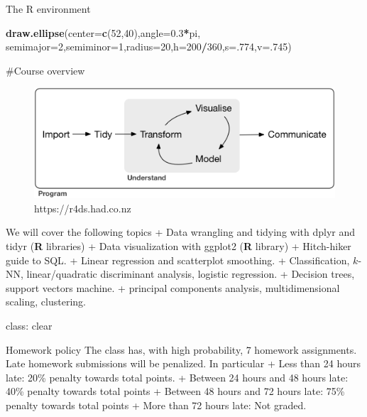 \documentclass[
  ignorenonframetext,
]{beamer}
\newenvironment{Shaded}{\begin{snugshade}}{\end{snugshade}}
\newcommand{\DataTypeTok}[1]{\textcolor[rgb]{0.13,0.29,0.53}{#1}}
\newcommand{\DecValTok}[1]{\textcolor[rgb]{0.00,0.00,0.81}{#1}}
\newcommand{\FloatTok}[1]{\textcolor[rgb]{0.00,0.00,0.81}{#1}}
\newcommand{\KeywordTok}[1]{\textcolor[rgb]{0.13,0.29,0.53}{\textbf{#1}}}
\newcommand{\NormalTok}[1]{#1}
\newcommand{\OperatorTok}[1]{\textcolor[rgb]{0.81,0.36,0.00}{\textbf{#1}}}
\begin{document}
\begin{frame}[fragile]{The R environment}
\begin{Shaded}
\begin{Highlighting}[]
        \KeywordTok{draw.ellipse}\NormalTok{(}\DataTypeTok{center=}\KeywordTok{c}\NormalTok{(}\DecValTok{52}\NormalTok{,}\DecValTok{40}\NormalTok{),}\DataTypeTok{angle=}\FloatTok{0.3}\OperatorTok{*}\NormalTok{pi,}
                     \DataTypeTok{semimajor=}\DecValTok{2}\NormalTok{,}\DataTypeTok{semiminor=}\DecValTok{1}\NormalTok{,}\DataTypeTok{radius=}\DecValTok{20}\NormalTok{,}\DataTypeTok{h=}\DecValTok{200}\OperatorTok{/}\DecValTok{360}\NormalTok{,}\DataTypeTok{s=}\NormalTok{.}\DecValTok{774}\NormalTok{,}\DataTypeTok{v=}\NormalTok{.}\DecValTok{745}\NormalTok{)}
\end{Highlighting}
\end{Shaded}

\#Course overview

\begin{figure}

{\centering \includegraphics[width=0.7\linewidth]{figures/data_science_pipeline} 

}

\caption{https://r4ds.had.co.nz}\label{fig:unnamed-chunk-19}
\end{figure}

We will cover the following topics + Data wrangling and tidying with
dplyr and tidyr (\textbf{R} libraries) + Data visualization with ggplot2
(\textbf{R} library) + Hitch-hiker guide to SQL. + Linear regression and
scatterplot smoothing. + Classification, \(k\)-NN, linear/quadratic
discriminant analysis, logistic regression. + Decision trees, support
vectors machine. + principal components analysis, multidimensional
scaling, clustering.

class: clear

\begin{block}{Homework policy}
\protect\hypertarget{homework-policy}{}
The class has, with high probability, 7 homework assignments. Late
homework submissions will be penalized. In particular + Less than 24
hours late: 20\% penalty towards total points. + Between 24 hours and 48
hours late: 40\% penalty towards total points + Between 48 hours and 72
hours late: 75\% penalty towards total points + More than 72 hours late:
Not graded.
\end{block}


\end{frame}
\end{document}
